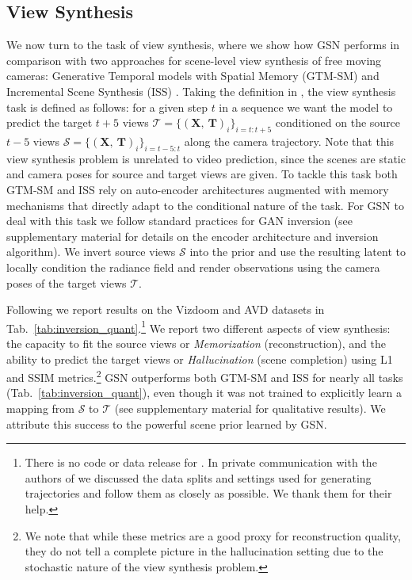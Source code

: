 \documentclass[10pt,twocolumn,letterpaper]{article}
\begin{document}
\subsection{View Synthesis}

We now turn to the task of view synthesis, where we show how GSN performs in comparison with two approaches for scene-level view synthesis of free moving cameras: Generative Temporal models with Spatial Memory (GTM-SM) \cite{gtmsm} and Incremental Scene Synthesis (ISS) \cite{iss}. Taking the definition in \cite{iss}, the view synthesis task is defined as follows: for a given step $t$ in a sequence we want the model to predict the target $t+5$ views $\mathcal{T}=\{(\textbf{X},~\textbf{T})_i\}_{i=t:t+5}$ conditioned on the source $t-5$ views $\mathcal{S}=\{(\textbf{X},~\textbf{T})_i\}_{i=t-5:t}$ along the camera trajectory. Note that this view synthesis problem is unrelated to video prediction, since the scenes are static and camera poses for source and target views are given. To tackle this task both GTM-SM \cite{gtmsm} and ISS \cite{iss} rely on auto-encoder architectures augmented with memory mechanisms that directly adapt to the conditional nature of the task. For GSN to deal with this task we follow standard practices for GAN inversion \cite{ganinversion} (see supplementary material for details on the encoder architecture and inversion algorithm). We invert source views $\mathcal{S}$ into the prior and use the resulting latent to locally condition the radiance field and render observations using the camera poses of the target views $\mathcal{T}$.

Following \cite{iss} we report results on the Vizdoom \cite{vizdoom} and AVD \cite{avd} datasets in Tab.~\ref{tab:inversion_quant}.\footnote{There is no code or data release for \cite{iss}. In private communication with the authors of \cite{iss} we discussed the data splits and settings used for generating trajectories and follow them as closely as possible. We thank them for their help.} We report two different aspects of view synthesis: the capacity to fit the source views or \textit{Memorization} (\eg reconstruction), and the ability to predict the target views or \textit{Hallucination} (\eg scene completion) using L1 and SSIM metrics.\footnote{We note that while these metrics are a good proxy for reconstruction quality, they do not tell a complete picture in the hallucination setting due to the stochastic nature of the view synthesis problem.} GSN outperforms both GTM-SM \cite{gtmsm} and ISS \cite{iss} for nearly all tasks (Tab.~\ref{tab:inversion_quant}), even though it was not trained to explicitly learn a mapping from $\mathcal{S}$ to $\mathcal{T}$ (see supplementary material for qualitative results). We attribute this success to the powerful scene prior learned by GSN.
\end{document}
